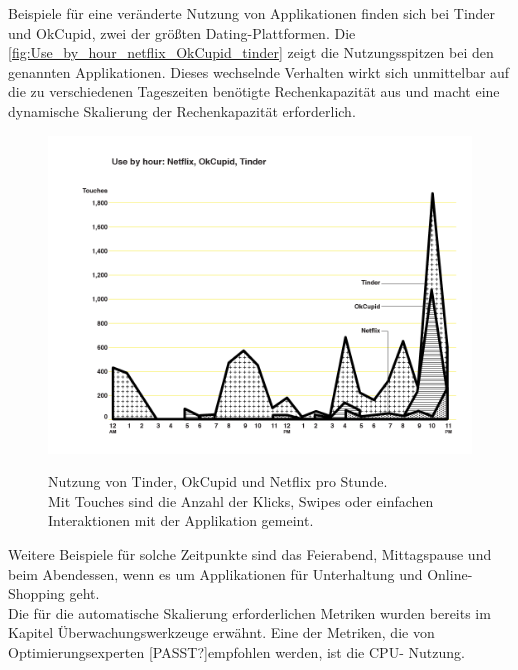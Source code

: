 Beispiele für eine veränderte Nutzung von Applikationen finden sich bei Tinder und OkCupid, zwei der größten Dating-Plattformen. Die \autoref{fig:Use_by_hour_netflix_OkCupid_tinder} zeigt die Nutzungsspitzen bei den genannten Applikationen. Dieses wechselnde Verhalten wirkt sich unmittelbar auf die zu verschiedenen Tageszeiten benötigte Rechenkapazität aus und macht eine dynamische Skalierung der Rechenkapazität erforderlich. 
\begin{figure}[h!]
  \centering
  \includegraphics[scale=0.33]{sources/Use_by_hour_netflix_OkCupid_tinder}
  \caption[Nutzung von Tinder, OkCupid und Netflix pro Stunde]{}\label{fig:Use_by_hour_netflix_OkCupid_tinder} Nutzung von Tinder, OkCupid und Netflix pro Stunde.  
  {\cite{SCOUT1}}
  \\Mit Touches sind die Anzahl der Klicks, Swipes oder einfachen Interaktionen mit der Applikation gemeint.
\end{figure}

Weitere Beispiele für solche Zeitpunkte sind das Feierabend, Mittagspause und beim Abendessen, wenn es um Applikationen für Unterhaltung und Online-Shopping geht.
\\
Die für die automatische Skalierung erforderlichen Metriken wurden bereits im Kapitel Überwachungswerkzeuge erwähnt. Eine der Metriken, die von Optimierungsexperten [PASST?]empfohlen werden, ist die CPU- Nutzung. 



